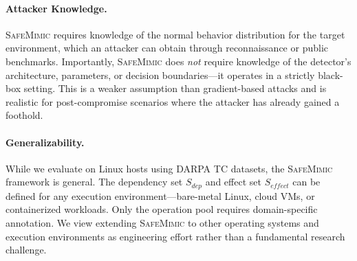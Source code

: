 \paragraph{Attacker Knowledge.}
\textsc{SafeMimic} requires knowledge of the normal behavior distribution for the target environment, which an attacker can obtain through reconnaissance or public benchmarks.
Importantly, \textsc{SafeMimic} does \emph{not} require knowledge of the detector's architecture, parameters, or decision boundaries---it operates in a strictly black-box setting.
This is a weaker assumption than gradient-based attacks and is realistic for post-compromise scenarios where the attacker has already gained a foothold.

\paragraph{Generalizability.}
While we evaluate on Linux hosts using DARPA TC datasets, the \textsc{SafeMimic} framework is general.
The dependency set $S_{\mathit{dep}}$ and effect set $S_{\mathit{effect}}$ can be defined for any execution environment---bare-metal Linux, cloud VMs, or containerized workloads.
Only the operation pool requires domain-specific annotation.
We view extending \textsc{SafeMimic} to other operating systems and execution environments as engineering effort rather than a fundamental research challenge.
